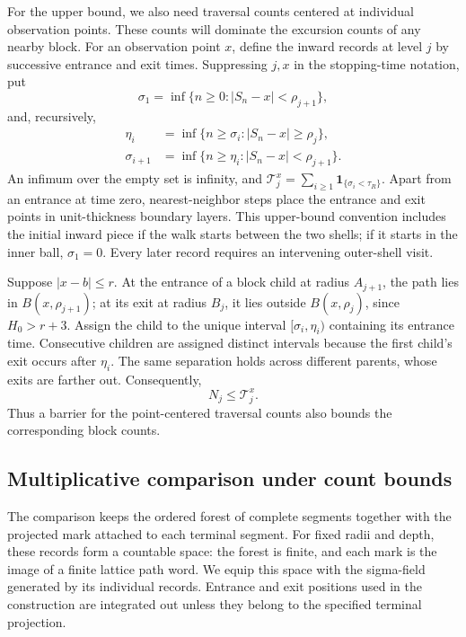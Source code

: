 \documentclass[11pt,letterpaper,reqno]{amsart}
\numberwithin{equation}{section}
\theoremstyle{remark}
\begin{document}
For the upper bound, we also need traversal counts centered at individual observation points. These counts will dominate the excursion counts of any nearby block. For an observation point $x$, define the inward records at level $j$ by successive entrance and exit times. Suppressing $j,x$ in the stopping-time notation, put
\[
\sigma_1=\inf\{n\ge0:|S_n-x|<\rho_{j+1}\},
\]
and, recursively,
\begin{equation}\label{eq:traversal-stopping}
\begin{aligned}
\eta_i&=\inf\{n\ge\sigma_i:|S_n-x|\ge\rho_j\},\\
\sigma_{i+1}&=\inf\{n\ge\eta_i:|S_n-x|<\rho_{j+1}\}.
\end{aligned}
\end{equation}
An infimum over the empty set is infinity, and
$\mathcal T_j^x=\sum_{i\ge1}\mathbf1_{\{\sigma_i<\tau_R\}}$.
Apart from an entrance at time zero, nearest-neighbor steps place the entrance and exit points in unit-thickness boundary layers. This upper-bound convention includes the initial inward piece if the walk starts between the two shells; if it starts in the inner ball, $\sigma_1=0$. Every later record requires an intervening outer-shell visit.

Suppose $|x-b|\le r$. At the entrance of a block child at radius $A_{j+1}$, the path lies in $B(x,\rho_{j+1})$; at its exit at radius $B_j$, it lies outside $B(x,\rho_j)$, since $H_0>r+3$. Assign the child to the unique interval $[\sigma_i,\eta_i)$ containing its entrance time. Consecutive children are assigned distinct intervals because the first child's exit occurs after $\eta_i$. The same separation holds across different parents, whose exits are farther out. Consequently,
\begin{equation}\label{eq:2.22}
N_j\le\mathcal T_j^x.
\end{equation}
Thus a barrier for the point-centered traversal counts also bounds the corresponding block counts.

\subsection{Multiplicative comparison under count bounds}\label{sec:recordcomparison}
The comparison keeps the ordered forest of complete segments together with the projected mark attached to each terminal segment. For fixed radii and depth, these records form a countable space: the forest is finite, and each mark is the image of a finite lattice path word. We equip this space with the sigma-field generated by its individual records. Entrance and exit positions used in the construction are integrated out unless they belong to the specified terminal projection.
\end{document}
